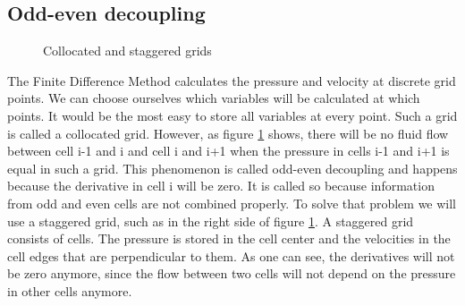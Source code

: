 \documentclass{article}
\begin{document}
\subsection{Odd-even decoupling} \label{odd-even}

\begin{figure}[h]
\centering
{} \caption{Collocated and staggered grids} \label{Odd-even decoupling} \end{figure}
The Finite Difference Method calculates the pressure and velocity at discrete grid points. We can choose ourselves which variables will be calculated at which points. It would be the most easy to store all variables at every point. Such a grid is called a collocated grid\cite{Staggered grid}. However, as figure \ref{Odd-even decoupling} shows, there will be no fluid flow between cell i-1 and i and cell i and i+1 when the pressure in cells i-1 and i+1 is equal in such a grid. This phenomenon is called odd-even decoupling and happens because the derivative in cell i will be zero\cite{Staggered grid}. It is called so because information from odd and even cells are not combined properly\cite{Staggered grid}. To solve that problem we will use a staggered grid, such as in the right side of figure \ref{Odd-even decoupling}. A staggered grid consists of cells. The pressure is stored in the cell center and the velocities in the cell edges that are perpendicular to them\cite{Staggered grid}. As one can see, the derivatives will not be zero anymore, since the flow between two cells will not depend on the pressure in other cells anymore.
\newpage
\end{document}
